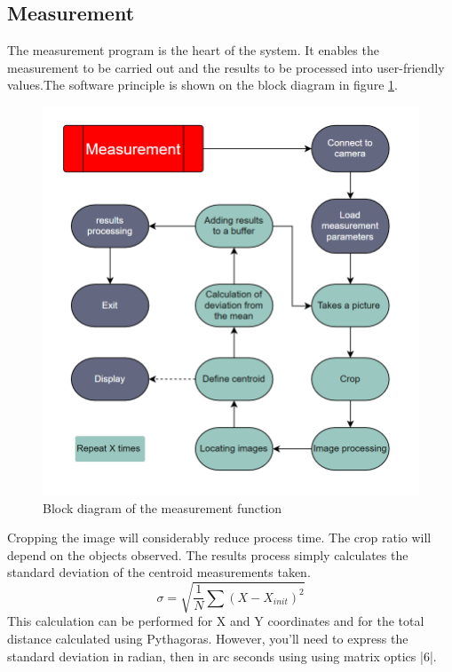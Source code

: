 \subsection{Measurement}
The measurement program is the heart of the system. It enables the measurement to be carried out and the results to be
processed into user-friendly values.The software principle is shown on the block diagram in figure \ref{fig:Soft_Meas}.
\begin{figure}[H]
    \centering
    \includegraphics[scale=0.85]{assets/figures/Software/Measurement.png}
    \caption{Block diagram of the measurement function}
    \label{fig:Soft_Meas}
\end{figure}
Cropping the image will considerably reduce process time. The crop ratio will depend on the objects observed.
\bigbreak
The results process simply calculates the standard deviation of the centroid measurements taken.
\begin{equation}
    \sigma = \sqrt{\frac{1}{N}\sum\left(X-X_{init}\right)^2}
\end{equation}
This calculation can be performed for X and Y coordinates and for the total distance calculated using Pythagoras.
However, you'll need to express the standard deviation in radian, then in arc seconds using using matrix optics |6|.
